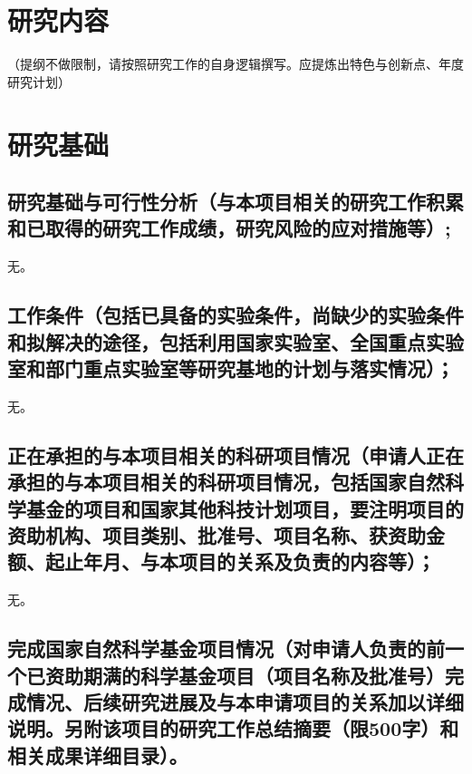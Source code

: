 \documentclass{nsfc}
\begin{document}




\chapter{研究内容}
{\large\kaishu\color{nsfc_blue}（提纲不做限制，请按照研究工作的自身逻辑撰写。应提炼出特色与创新点、年度研究计划）}


\chapter{研究基础}


\section{\textbf{研究基础与可行性分析}（与本项目相关的研究工作积累和已取得的研究工作成绩，研究风险的应对措施等）;}

无。

\section{\textbf{工作条件}（包括已具备的实验条件，尚缺少的实验条件和拟解决的途径，包括利用国家实验室、全国重点实验室和部门重点实验室等研究基地的计划与落实情况）；}

无。

\section{\textbf{正在承担的与本项目相关的科研项目情况}（申请人正在承担的与本项目相关的科研项目情况，包括国家自然科学基金的项目和国家其他科技计划项目，要注明项目的资助机构、项目类别、批准号、项目名称、获资助金额、起止年月、与本项目的关系及负责的内容等）；}

无。

\section{\textbf{完成国家自然科学基金项目情况}（对申请人负责的前一个已资助期满的科学基金项目（项目名称及批准号）完成情况、后续研究进展及与本申请项目的关系加以详细说明。另附该项目的研究工作总结摘要（限500字）和相关成果详细目录）。}
\end{document}
